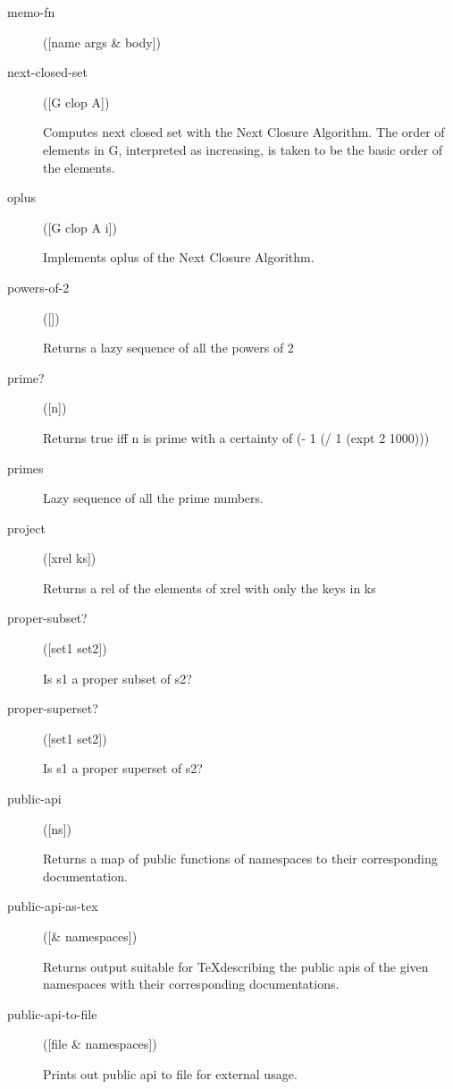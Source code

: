 \begin{description}
  \item[memo-fn]
([name args \& body])



  \item[next-closed-set]
([G clop A])

Computes next closed set with the Next Closure Algorithm. The order of elements in G,
  interpreted as increasing, is taken to be the basic order of the elements.

  \item[oplus]
([G clop A i])

Implements oplus of the Next Closure Algorithm.

  \item[powers-of-2]
([])

Returns a lazy sequence of all the powers of 2

  \item[prime?]
([n])

Returns true iff n is prime with a certainty of (- 1 (/ 1 (expt 2 1000)))

  \item[primes]


Lazy sequence of all the prime numbers.

  \item[project]
([xrel ks])

Returns a rel of the elements of xrel with only the keys in ks

  \item[proper-subset?]
([set1 set2])

Is s1 a proper subset of s2?

  \item[proper-superset?]
([set1 set2])

Is s1 a proper superset of s2?

  \item[public-api]
([ns])

Returns a map of public functions of namespaces to their
  corresponding documentation.

  \item[public-api-as-tex]
([\& namespaces])

Returns output suitable for \TeX describing the public apis of the
  given namespaces with their corresponding documentations.

  \item[public-api-to-file]
([file \& namespaces])

Prints out public api to file for external usage.


\end{description}
